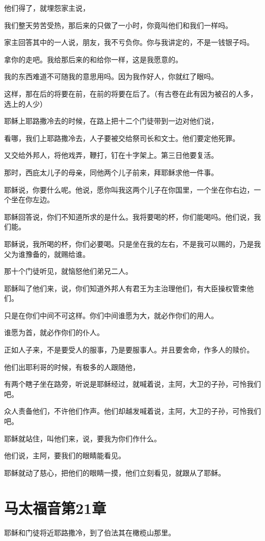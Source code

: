 \documentclass[12pt,oneside]{book}
\begin{document}
他们得了，就埋怨家主说，

我们整天劳苦受热，那后来的只做了一小时，你竟叫他们和我们一样吗。

家主回答其中的一人说，朋友，我不亏负你。你与我讲定的，不是一钱银子吗。

拿你的走吧。我给那后来的和给你一样，这是我愿意的。

我的东西难道不可随我的意思用吗。因为我作好人，你就红了眼吗。

这样，那在后的将要在前，在前的将要在后了。（有古卷在此有因为被召的人多，选上的人少）

耶稣上耶路撒冷去的时候，在路上把十二个门徒带到一边对他们说，

看哪，我们上耶路撒冷去，人子要被交给祭司长和文士。他们要定他死罪。

又交给外邦人，将他戏弄，鞭打，钉在十字架上。第三日他要复活。

那时，西庇太儿子的母亲，同他两个儿子前来，拜耶稣求他一件事。

耶稣说，你要什么呢。他说，愿你叫我这两个儿子在你国里，一个坐在你右边，一个坐在你左边。

耶稣回答说，你们不知道所求的是什么。我将要喝的杯，你们能喝吗。他们说，我们能。

耶稣说，我所喝的杯，你们必要喝。只是坐在我的左右，不是我可以赐的，乃是我父为谁豫备的，就赐给谁。

那十个门徒听见，就恼怒他们弟兄二人。

耶稣叫了他们来，说，你们知道外邦人有君王为主治理他们，有大臣操权管束他们。

只是在你们中间不可这样。你们中间谁愿为大，就必作你们的用人。

谁愿为首，就必作你们的仆人。

正如人子来，不是要受人的服事，乃是要服事人。并且要舍命，作多人的赎价。

他们出耶利哥的时候，有极多的人跟随他，

有两个瞎子坐在路旁，听说是耶稣经过，就喊着说，主阿，大卫的子孙，可怜我们吧。

众人责备他们，不许他们作声。他们却越发喊着说，主阿，大卫的子孙，可怜我们吧。

耶稣就站住，叫他们来，说，要我为你们作什么。

他们说，主阿，要我们的眼睛能看见。

耶稣就动了慈心，把他们的眼睛一摸，他们立刻看见，就跟从了耶稣。

\chapter{马太福音第21章}
耶稣和门徒将近耶路撒冷，到了伯法其在橄榄山那里。
\end{document}
